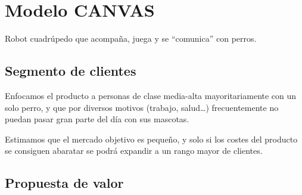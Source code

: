 \section{Modelo CANVAS}

Robot cuadrúpedo que acompaña, juega y se ``comunica'' con perros.

\begin{figure}[H]
    \centering
\end{figure}

\subsection{Segmento de clientes}


Enfocamos el producto a personas de clase media-alta mayoritariamente con un solo perro, y que por diversos motivos (trabajo, salud\dots) frecuentemente no puedan pasar gran parte del día con sus mascotas.

Estimamos que el mercado objetivo es pequeño, y solo si los costes del producto se consiguen abaratar se podrá expandir a un rango mayor de clientes.

\subsection{Propuesta de valor}



